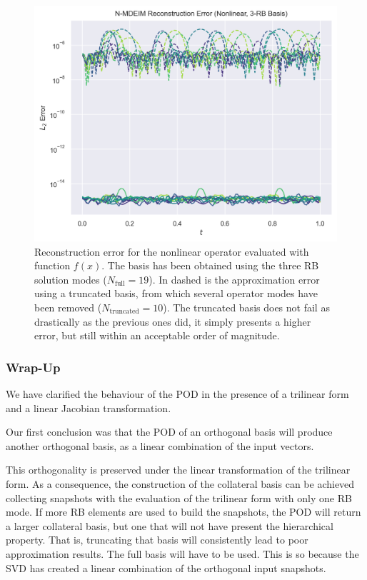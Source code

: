 \documentclass[../../thesis.tex]{subfiles}
\begin{document}
\begin{figure}[h]
    \includegraphics[width=\columnwidth]{research_project/piston/figures/svd_fourier/trilinear_nonlinear/rb_basis_mdeim_errors_nonlinear_num_3.png}
    \caption{Reconstruction error for the nonlinear operator evaluated with function $f(x)$.
    The basis has been obtained using the three RB solution modes ($N_{\text{full}}=19$).
    In dashed is the approximation error using a truncated basis, 
    from which several operator modes have been removed ($N_{\text{truncated}}=10$). 
    The truncated basis does not fail as drastically as the previous ones did, it simply presents a higher error,
    but still within an acceptable order of magnitude.}
    \label{fig:appendix_rb_nonlinear_num_3}
\end{figure}

\subsubsection{Wrap-Up}
We have clarified the behaviour of the POD in the presence of a trilinear form 
and a linear Jacobian transformation.

Our first conclusion was that the POD of an orthogonal basis will produce
another orthogonal basis, as a linear combination of the input vectors.

This orthogonality is preserved under the linear transformation of the trilinear form.
As a consequence, the construction of the collateral basis can be achieved 
collecting snapshots with the evaluation of the trilinear form with 
only one RB mode.
If more RB elements are used to build the snapshots, 
the POD will return a larger collateral basis,
but one that will not have present the hierarchical property.
That is, truncating that basis will consistently lead to poor approximation results.
The full basis will have to be used.
This is so because the SVD has created a linear combination of the orthogonal input snapshots.
\end{document}

